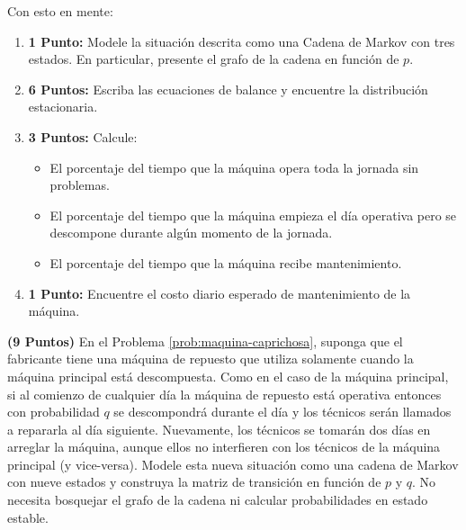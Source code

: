 \documentclass[ a4paper, twoside, 11pt]{article}
\begin{document}
\begin{problem}
Con esto en mente: 
\begin{enumerate}[label=\textbf{\alph*)}]
\item \textbf{1 Punto:} Modele la situaci\'on descrita como una Cadena de Markov con tres estados. \linebreak En particular, presente el grafo de la cadena en funci\'on de $p$. 
\item \textbf{6 Puntos:} Escriba las ecuaciones de balance y encuentre la distribuci\'on estacionaria. 
\item \textbf{3 Puntos:} Calcule: 
\begin{itemize}
\item El porcentaje del tiempo que la m\'aquina opera toda la jornada sin problemas. 
\item El porcentaje del tiempo que la m\'aquina empieza el d\'ia operativa pero se descompone durante alg\'un momento de la jornada. 
\item El porcentaje del tiempo que la m\'aquina recibe mantenimiento. 
\end{itemize}
\item \textbf{1 Punto:} Encuentre el costo diario esperado de mantenimiento de la m\'aquina. 
\end{enumerate}

\end{problem}
\fullskip

\begin{problem}
\textbf{(9 Puntos)} En el Problema \ref{prob:maquina-caprichosa}, suponga que el fabricante tiene una m\'aquina de repuesto que utiliza solamente cuando la m\'aquina principal est\'a descompuesta. Como en el caso de la m\'aquina principal, si al comienzo de cualquier d\'ia la m\'aquina de repuesto est\'a operativa entonces con probabilidad $q$ se descompondr\'a durante el d\'ia y los t\'ecnicos ser\'an llamados a repararla al d\'ia siguiente. Nuevamente, los t\'ecnicos se tomar\'an dos d\'ias en arreglar la m\'aquina, aunque ellos no interfieren con los t\'ecnicos de la m\'aquina principal (y vice-versa). Modele esta nueva situaci\'on como una cadena de Markov con nueve estados y construya la matriz de transici\'on en funci\'on de $p$ y $q$. No necesita bosquejar el grafo de la cadena ni calcular probabilidades en estado estable. 

\end{problem}
\vspace{\baselineskip}
\end{document}
